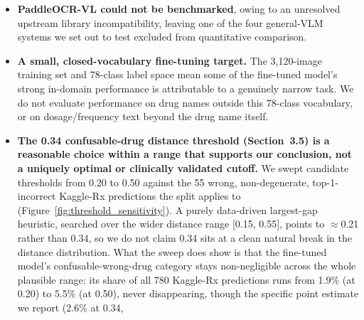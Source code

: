 \documentclass[12pt]{article}
\begin{document}
\begin{itemize}[leftmargin=*]
SD: r = 32 keeps the lowest mean CER on both Kaggle-Rx (0.130 $\pm$ 0.016) and IAM (0.529 $\pm$ 0.029),
consistent with the validation-set selection, but the spread across runs is large enough that r = 16 wins
outright on one of the three runs on both datasets (Kaggle-Rx CER 0.127 versus r = 32's 0.146 at seed 123;
IAM 0.495 versus 0.560 at seed 2024). We therefore continue to treat ``r = 32 beats r = 16'' as favored on
average rather than decisively established per-run, and, as already noted in Sections~4.2 and~5, no longer
treat ``r = 8 beats r = 16'' as established at all: one of r = 8's own three runs (seed 2024, CER 0.146)
already beats the original single-run r = 16 result (0.149) reported in Table~\ref{tab:ablation}. A full
replication with five seeds per rank and the same Wilcoxon/Holm--Bonferroni/rank-biserial pipeline
(Section~3.3) re-run across seeds, which we judge would be needed to formally establish rather than merely
support a rank ordering, remained beyond the free-tier GPU budget of this study.
\item \textbf{PaddleOCR-VL could not be benchmarked}, owing to an unresolved upstream library
incompatibility, leaving one of the four general-VLM systems we set out to test excluded from quantitative
comparison.
\item \textbf{A small, closed-vocabulary fine-tuning target.} The 3{,}120-image training set and 78-class
label space mean some of the fine-tuned model's strong in-domain performance is attributable to a genuinely
narrow task. We do not evaluate performance on drug names outside this 78-class vocabulary, or on
dosage/frequency text beyond the drug name itself.
\item \textbf{The 0.34 confusable-drug distance threshold (Section~3.5) is a reasonable choice within a
range that supports our conclusion, not a uniquely optimal or clinically validated cutoff.} We swept
candidate thresholds from 0.20 to 0.50 against the 55 wrong, non-degenerate, top-1-incorrect Kaggle-Rx
predictions the split applies to (Figure~\ref{fig:threshold_sensitivity}). A purely data-driven
largest-gap heuristic, searched over the wider distance range [0.15, 0.55], points to $\approx$0.21 rather
than 0.34, so we do not claim 0.34 sits at a clean natural break in the distance distribution. What the
sweep does show is that the fine-tuned model's confusable-wrong-drug category stays non-negligible across
the whole plausible range: its share of all 780 Kaggle-Rx predictions runs from 1.9\% (at 0.20) to 5.5\% (at
0.50), never disappearing, though the specific point estimate we report (2.6\% at 0.34,

\end{itemize}
\end{document}
